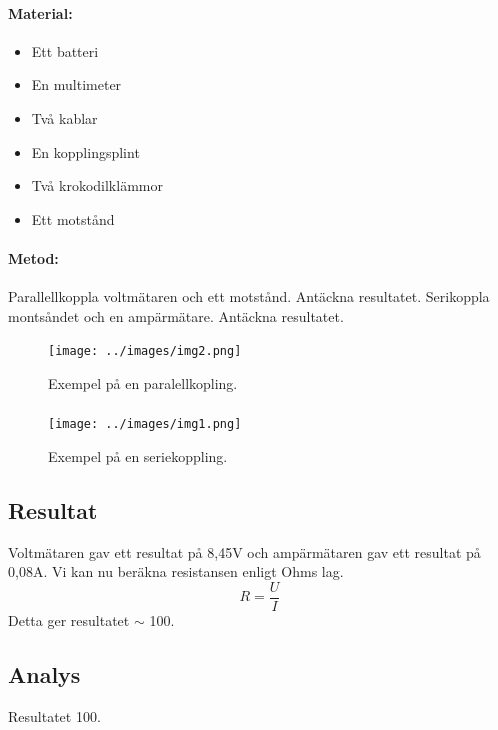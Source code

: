 \documentclass[11p]{article}
\begin{document}
       \paragraph{Material:}
       \begin{itemize}
           \item Ett batteri
            \item En multimeter
            \item Två kablar
            \item En kopplingsplint
            \item Två krokodilklämmor
            \item Ett motstånd
       \end{itemize}
        \paragraph{Metod:}
        Parallellkoppla voltmätaren och ett motstånd.
        Antäckna resultatet.
        Serikoppla montsåndet och en ampärmätare.
        Antäckna resultatet.
        \begin{figure}[!h]
        \texttt{[image: ../images/img2.png]}
        \caption{Exempel på en paralellkopling.}
        \label{fig:paralell}
        \end{figure}
        \paragraph{}
        \begin{figure}[!h]
        \texttt{[image: ../images/img1.png]}
        \caption{Exempel på en seriekoppling.}
        \label{fig:serie}
        \end{figure}
    \subsection{Resultat}
    Voltmätaren gav ett resultat på 8,45V och ampärmätaren gav ett resultat på 0,08A\@.
    Vi kan nu beräkna resistansen enligt Ohms lag.
    \begin{equation}
        R = \frac{U}{I}
    \end{equation}
    Detta ger resultatet $\sim$ 100\Omega.

    \subsection{Analys}
    Resultatet 100\Omega{}\Omega.
    \newpage
\end{document}
